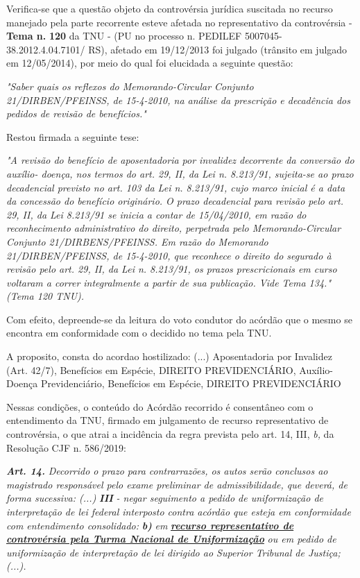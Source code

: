 \documentclass[12pt]{article}
\begin{document}
\justifying
\noindent Verifica-se que a questão objeto da controvérsia jurídica suscitada no recurso manejado pela parte recorrente esteve afetada no representativo da controvérsia - \textbf{Tema n. }\textbf{120} da TNU - (PU no processo n. PEDILEF 5007045-38.2012.4.04.7101/ RS),  afetado em 19/12/2013 foi julgado (trânsito em julgado em 12/05/2014), por meio do qual foi elucidada a seguinte questão:

\noindent \textit{"Saber quais os reflexos do Memorando-Circular Conjunto 21/DIRBEN/PFEINSS, de 15-4-2010, na análise da prescrição e decadência dos pedidos de revisão de benefícios."}

\noindent Restou firmada a seguinte tese:

\noindent \textit{"A revisão do benefício de aposentadoria por invalidez decorrente da conversão do auxílio- doença, nos termos do art. 29, II, da Lei n. 8.213/91, sujeita-se ao prazo decadencial previsto no art. 103 da Lei n. 8.213/91, cujo marco inicial é a data da concessão do benefício originário. O prazo decadencial para revisão pelo art. 29, II, da Lei 8.213/91 se inicia a contar de 15/04/2010, em razão do reconhecimento administrativo do direito, perpetrada pelo Memorando-Circular Conjunto 21/DIRBENS/PFEINSS. Em razão do Memorando 21/DIRBEN/PFEINSS, de 15-4-2010, que reconhece o direito do segurado à revisão pelo art. 29, II, da Lei n. 8.213/91, os prazos prescricionais em curso voltaram a correr integralmente a partir de sua publicação. Vide Tema 134." (Tema 120 TNU).}

\noindent Com efeito, depreende-se da leitura do voto condutor do acórdão que o mesmo se encontra em conformidade com o decidido no  tema pela TNU.

\noindent A proposito, consta do acordao hostilizado: (...) Aposentadoria por Invalidez (Art. 42/7), Benefícios em Espécie, DIREITO PREVIDENCIÁRIO, Auxílio-Doença Previdenciário, Benefícios em Espécie, DIREITO PREVIDENCIÁRIO

\noindent Nessas condições, o conteúdo do Acórdão recorrido é consentâneo com o entendimento da TNU, firmado em julgamento de recurso representativo de controvérsia, o que atrai a incidência da regra prevista pelo art. 14, III, \textit{b,} da Resolução CJF n. 586/2019:

\noindent \textit{\textbf{Art. 14.}}\textit{ Decorrido o prazo para contrarrazões, os autos serão conclusos ao magistrado responsável pelo exame preliminar de admissibilidade, que deverá, de forma sucessiva: (...) }\textit{\textbf{III }}\textit{- negar seguimento a pedido de uniformização de interpretação de lei federal interposto contra acórdão que esteja em conformidade com entendimento consolidado: }\textit{\textbf{b)}}\textit{ em }\uline{\textit{\textbf{recurso representativo de controvérsia pela Turma Nacional de Uniformização}}}\textit{ ou em pedido de uniformização de interpretação de lei dirigido ao Superior Tribunal de Justiça;(...).}
\end{document}
